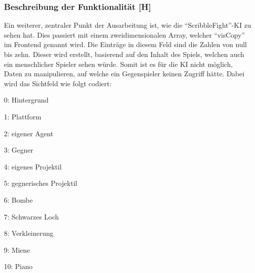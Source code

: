 \subsubsection{Beschreibung der Funktionalität [H]}
Ein weiterer, zentraler Punkt der Ausarbeitung ist, wie die ``ScribbleFight''-KI zu sehen hat. Dies passiert mit einem zweidimensionalen Array, welcher ``visCopy'' im Frontend genannt wird. Die Einträge in diesem Feld sind die Zahlen von null bis zehn. Dieser wird erstellt, basierend auf den Inhalt des Spiels, welchen auch ein menschlicher Spieler sehen würde. Somit ist es für die KI nicht möglich, Daten zu manipulieren, auf welche ein Gegenspieler keinen Zugriff hätte. Dabei wird das Sichtfeld wie folgt codiert:
\begin{compactitem}\label{mappedPixels}
    \item 0: Hintergrund
    \item 1: Plattform
    \item 2: eigener Agent
    \item 3: Gegner
    \item 4: eigenes Projektil
    \item 5: gegnerisches Projektil
    \item 6: Bombe
    \item 7: Schwarzes Loch
    \item 8: Verkleinerung
    \item 9: Miene
    \item 10: Piano
\end{compactitem}

